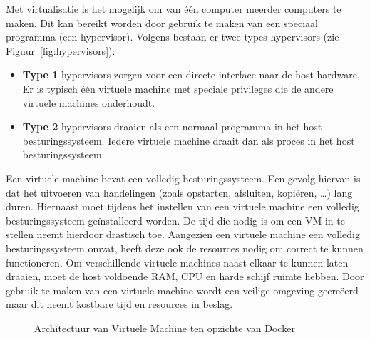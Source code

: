 Met virtualisatie is het mogelijk om van één computer meerder computers te maken.
Dit kan bereikt worden door gebruik te maken van een speciaal programma (een hypervisor).
Volgens \citet{fenn2008evaluation} bestaan er twee types hypervisors (zie Figuur~\ref{fig:hypervisors}):
\begin{itemize}
\item \textbf{Type 1} hypervisors zorgen voor een directe interface naar de host hardware.
Er is typisch één virtuele machine met speciale privileges die de andere virtuele machines onderhoudt.
\item \textbf{Type 2} hypervisors draaien als een normaal programma in het host besturingssysteem.
Iedere virtuele machine draait dan als proces in het host besturingssysteem.
\end{itemize}

Een virtuele machine bevat een volledig besturingssysteem.
Een gevolg hiervan is dat het uitvoeren van handelingen (zoals opstarten, afsluiten, kopiëren, \ldots) lang duren.
Hiernaast moet tijdens het instellen van een virtuele machine een volledig besturingssysteem geïnstalleerd worden.
De tijd die nodig is om een VM in te stellen neemt hierdoor drastisch toe.
Aangezien een virtuele machine een volledig besturingssysteem omvat, heeft deze ook de resources nodig om correct te kunnen functioneren.
Om verschillende virtuele machines naast elkaar te kunnen laten draaien, moet de host voldoende RAM, CPU en harde schijf ruimte hebben.
Door gebruik te maken van een virtuele machine wordt een veilige omgeving gecreëerd maar dit neemt kostbare tijd en resources in beslag.

\begin{figure}[!ht]
\centering
{}
\caption{Architectuur van Virtuele Machine ten opzichte van Docker \citep{dockerMain}}
\label{fig:VMvsDocker}
\end{figure}

